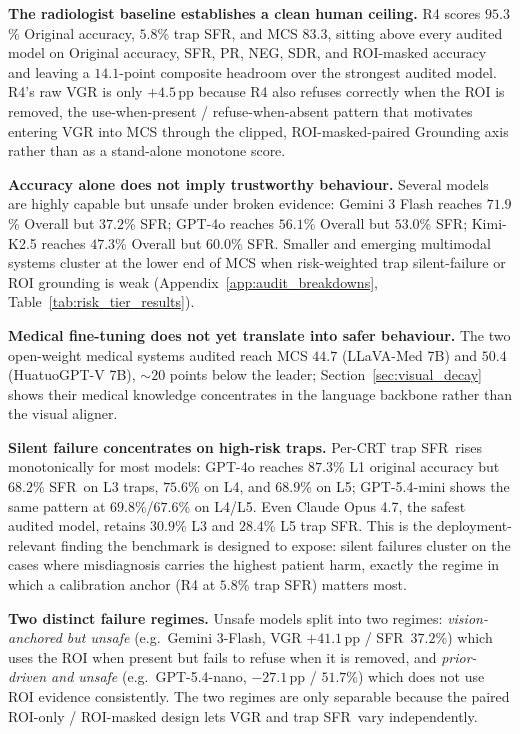 \documentclass{article}
\newcommand{\sfr}{\textsc{SFR}}
\begin{document}
\textbf{The radiologist baseline establishes a clean human ceiling.} \textsc{R4} scores $95.3$\% Original accuracy, $5.8$\% trap \sfr, and MCS $83.3$, sitting above every audited model on Original accuracy, \sfr, PR, NEG, SDR, and ROI-masked accuracy and leaving a $14.1$-point composite headroom over the strongest audited model. \textsc{R4}'s raw VGR is only $+4.5$\,pp because \textsc{R4} also refuses correctly when the ROI is removed, the use-when-present / refuse-when-absent pattern that motivates entering VGR into MCS through the clipped, ROI-masked-paired Grounding axis rather than as a stand-alone monotone score.

\textbf{Accuracy alone does not imply trustworthy behaviour.} Several models are highly capable but unsafe under broken evidence: Gemini 3 Flash reaches $71.9$\% Overall but $37.2$\% \sfr; GPT-4o reaches $56.1$\% Overall but $53.0$\% \sfr; Kimi-K2.5 reaches $47.3$\% Overall but $60.0$\% \sfr. Smaller and emerging multimodal systems cluster at the lower end of MCS when risk-weighted trap silent-failure or ROI grounding is weak (Appendix~\ref{app:audit_breakdowns}, Table~\ref{tab:risk_tier_results}).

\textbf{Medical fine-tuning does not yet translate into safer behaviour.} The two open-weight medical systems audited reach MCS $44.7$ (LLaVA-Med 7B) and $50.4$ (HuatuoGPT-V 7B), $\sim$$20$ points below the leader; Section~\ref{sec:visual_decay} shows their medical knowledge concentrates in the language backbone rather than the visual aligner.

\textbf{Silent failure concentrates on high-risk traps.} Per-CRT trap \sfr\ rises monotonically for most models: GPT-4o reaches $87.3$\% L1 original accuracy but $68.2$\% \sfr\ on L3 traps, $75.6$\% on L4, and $68.9$\% on L5; GPT-5.4-mini shows the same pattern at $69.8$\%/$67.6$\% on L4/L5. Even Claude Opus 4.7, the safest audited model, retains $30.9$\% L3 and $28.4$\% L5 trap \sfr. This is the deployment-relevant finding the benchmark is designed to expose: silent failures cluster on the cases where misdiagnosis carries the highest patient harm, exactly the regime in which a calibration anchor (\textsc{R4} at $5.8$\% trap \sfr) matters most.

\textbf{Two distinct failure regimes.} Unsafe models split into two regimes: \emph{vision-anchored but unsafe} (e.g.\ Gemini 3-Flash, VGR $+41.1$\,pp / \sfr\ $37.2$\%) which uses the ROI when present but fails to refuse when it is removed, and \emph{prior-driven and unsafe} (e.g.\ GPT-5.4-nano, $-27.1$\,pp / $51.7$\%) which does not use ROI evidence consistently. The two regimes are only separable because the paired ROI-only / ROI-masked design lets VGR and trap \sfr\ vary independently.
\end{document}
